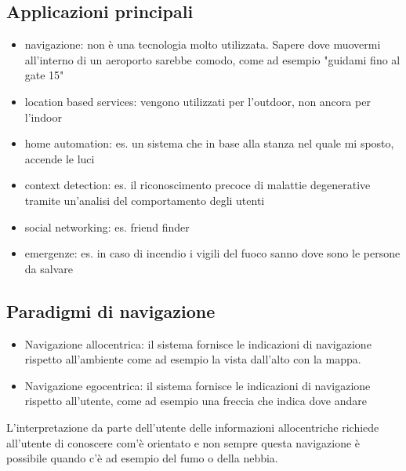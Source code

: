 \subsection{Applicazioni principali}
\begin{itemize}
    \item navigazione: non è una tecnologia molto utilizzata. Sapere dove muovermi all'interno di un aeroporto sarebbe comodo, come ad esempio "guidami fino al gate 15"
    \item location based services: vengono utilizzati per l'outdoor, non ancora per l'indoor 
    \item home automation: es. un sistema che in base alla stanza nel quale mi sposto, accende le luci
    \item context detection: es. il riconoscimento precoce di malattie degenerative tramite un'analisi del comportamento degli utenti
    \item social networking: es. friend finder
    \item emergenze: es. in caso di incendio i vigili del fuoco sanno dove sono le persone da salvare
\end{itemize}

\subsection{Paradigmi di navigazione}
\begin{itemize}
    \item Navigazione allocentrica: il sistema fornisce le indicazioni di navigazione rispetto all'ambiente come ad esempio la vista dall'alto con la mappa. 
    \item Navigazione egocentrica: il sistema fornisce le indicazioni di navigazione rispetto all'utente, come ad esempio una freccia che indica dove andare
\end{itemize}
L'interpretazione da parte dell'utente delle informazioni allocentriche richiede all'utente di conoscere com'è orientato e non sempre questa navigazione è possibile quando c'è ad esempio del fumo o della nebbia. 

